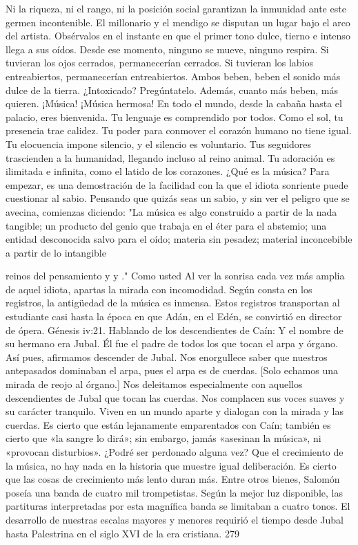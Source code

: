 Ni la riqueza, ni el rango, ni la posición social garantizan la inmunidad ante este germen incontenible. El millonario y el mendigo se disputan un lugar bajo el arco del artista. Obsérvalos en el instante en que el primer tono dulce, tierno e intenso llega a sus oídos. Desde ese momento, ninguno se mueve, ninguno respira. Si tuvieran los ojos cerrados, permanecerían cerrados. Si tuvieran los labios entreabiertos, permanecerían entreabiertos. Ambos beben, beben el sonido más dulce de la tierra.
¿Intoxicado? Pregúntatelo.
Además, cuanto más beben, más quieren.
¡Música! ¡Música hermosa! En todo el mundo, desde la cabaña hasta el palacio, eres bienvenida. Tu lenguaje es comprendido por todos. Como el sol, tu presencia trae calidez. Tu poder para conmover el corazón humano no tiene igual. Tu elocuencia impone silencio, y el silencio es voluntario. Tus seguidores trascienden a la humanidad, llegando incluso al reino animal. Tu adoración es ilimitada e infinita, como el latido de los corazones.
¿Qué es la música? 
Para empezar, es una demostración de la facilidad con la que el idiota sonriente puede cuestionar al sabio. Pensando que quizás seas un sabio, y sin ver el peligro que se avecina, comienzas diciendo: "La música es algo construido a partir de la nada tangible; un producto del genio que trabaja en el éter para el abstemio; una entidad desconocida salvo para el oído; materia sin pesadez; material inconcebible a partir de lo intangible


reinos del pensamiento y y ." Como usted
Al ver la sonrisa cada vez más amplia de aquel idiota, apartas la mirada con incomodidad.
Según consta en los registros, la antigüedad de la música es inmensa. Estos registros transportan al estudiante casi hasta la época en que Adán, en el Edén, se convirtió en director de ópera.
Génesis iv:21. Hablando de los descendientes de Caín: Y el nombre de su hermano era Jubal. Él fue el padre de todos los que tocan el arpa y
órgano.
Así pues, afirmamos descender de Jubal. Nos enorgullece saber que nuestros antepasados dominaban el arpa, pues el arpa es de cuerdas.
[Solo echamos una mirada de reojo al órgano.] Nos deleitamos especialmente con aquellos descendientes de Jubal que tocan las cuerdas. Nos complacen sus voces suaves y su carácter tranquilo. Viven en un mundo aparte y dialogan con la mirada y las cuerdas. Es cierto que están lejanamente emparentados con Caín; también es cierto que «la sangre lo dirá»; sin embargo, jamás «asesinan la música», ni «provocan disturbios».
¿Podré ser perdonado alguna vez?
Que el crecimiento de la música, no hay nada en la historia que muestre igual deliberación. Es cierto que las cosas de crecimiento más lento duran más. Entre otros bienes, Salomón poseía una banda de cuatro mil trompetistas. Según la mejor luz disponible, las partituras interpretadas por esta magnífica banda se limitaban a cuatro tonos. El desarrollo de nuestras escalas mayores y menores requirió el tiempo desde Jubal hasta Palestrina en el siglo XVI de la era cristiana.
279


